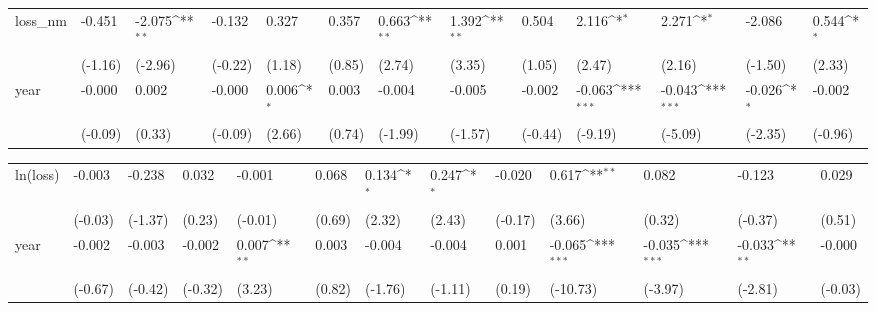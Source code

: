 \def\sym#1{\ifmmode^{#1}\else\(^{#1}\)\fi}
\begin{tabular}{p{1.5cm} p{1.7cm} p{1.7cm} p{1.7cm} p{1.7cm} p{1.7cm} p{1.7cm} p{1.7cm} p{1.7cm} p{1.7cm} p{1.7cm} p{1.7cm} p{1.7cm}}
\hline
loss\_nm         &   -0.451         &   -2.075\sym{**} &   -0.132         &    0.327         &    0.357         &    0.663\sym{**} &    1.392\sym{**} &    0.504         &    2.116\sym{*}  &    2.271\sym{*}  &   -2.086         &    0.544\sym{*}  \\
                &  (-1.16)         &  (-2.96)         &  (-0.22)         &   (1.18)         &   (0.85)         &   (2.74)         &   (3.35)         &   (1.05)         &   (2.47)         &   (2.16)         &  (-1.50)         &   (2.33)         \\
year            &   -0.000         &    0.002         &   -0.000         &    0.006\sym{*}  &    0.003         &   -0.004         &   -0.005         &   -0.002         &   -0.063\sym{***}&   -0.043\sym{***}&   -0.026\sym{*}  &   -0.002         \\
                &  (-0.09)         &   (0.33)         &  (-0.09)         &   (2.66)         &   (0.74)         &  (-1.99)         &  (-1.57)         &  (-0.44)         &  (-9.19)         &  (-5.09)         &  (-2.35)         &  (-0.96)         \\
\end{tabular}
\def\sym#1{\ifmmode^{#1}\else\(^{#1}\)\fi}
\begin{tabular}{p{1.5cm} p{1.7cm} p{1.7cm} p{1.7cm} p{1.7cm} p{1.7cm} p{1.7cm} p{1.7cm} p{1.7cm} p{1.7cm} p{1.7cm} p{1.7cm} p{1.7cm}}
\hline
ln(loss)        &   -0.003         &   -0.238         &    0.032         &   -0.001         &    0.068         &    0.134\sym{*}  &    0.247\sym{*}  &   -0.020         &    0.617\sym{**} &    0.082         &   -0.123         &    0.029         \\
                &  (-0.03)         &  (-1.37)         &   (0.23)         &  (-0.01)         &   (0.69)         &   (2.32)         &   (2.43)         &  (-0.17)         &   (3.66)         &   (0.32)         &  (-0.37)         &   (0.51)         \\
year            &   -0.002         &   -0.003         &   -0.002         &    0.007\sym{**} &    0.003         &   -0.004         &   -0.004         &    0.001         &   -0.065\sym{***}&   -0.035\sym{***}&   -0.033\sym{**} &   -0.000         \\
                &  (-0.67)         &  (-0.42)         &  (-0.32)         &   (3.23)         &   (0.82)         &  (-1.76)         &  (-1.11)         &   (0.19)         & (-10.73)         &  (-3.97)         &  (-2.81)         &  (-0.03)         \\
\end{tabular}
